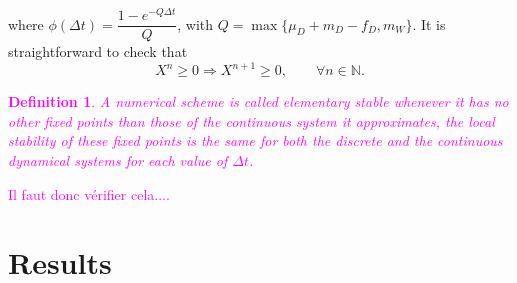 \documentclass{article}
\newcommand{\YD}[1]{\textcolor{magenta}{#1}}
\newtheorem{definition}{Definition}
\begin{document}
where $\phi(\Delta t)=\dfrac{1-e^{-Q\Delta t}}{Q}$, with $Q=\max\{\mu_D+m_D-f_D,m_W\}$. 
It is straightforward to check that
$$
X^n \geq 0 \Rightarrow X^{n+1}\geq 0,\qquad \forall n\in \mathbb{N}.
$$
\YD{
\begin{definition}
A numerical scheme is called elementary stable whenever it has no other fixed points than those of the continuous system it approximates, the local stability of these fixed points is the same for both the discrete and the continuous dynamical systems for each value of $\Delta t$.
\end{definition}
Il faut donc vérifier cela....
}
\section{Results}



\end{document}
